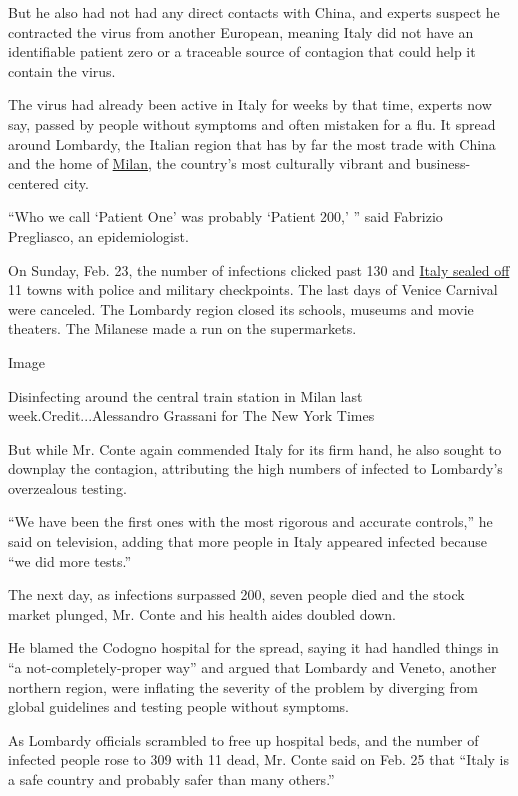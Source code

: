 But he also had not had any direct contacts with China, and experts
suspect he contracted the virus from another European, meaning Italy did
not have an identifiable patient zero or a traceable source of contagion
that could help it contain the virus.

The virus had already been active in Italy for weeks by that time,
experts now say, passed by people without symptoms and often mistaken
for a flu. It spread around Lombardy, the Italian region that has by far
the most trade with China and the home of
\href{https://www.nytimes3xbfgragh.onion/2020/02/24/world/europe/24coronavirus-milan-italy.html?searchResultPosition=40}{Milan},
the country's most culturally vibrant and business-centered city.

``Who we call `Patient One' was probably `Patient 200,' '' said Fabrizio
Pregliasco, an epidemiologist.

On Sunday, Feb. 23, the number of infections clicked past 130 and
\href{https://www.nytimes3xbfgragh.onion/2020/02/23/world/europe/italy-coronavirus.html?searchResultPosition=3}{Italy
sealed off} 11 towns with police and military checkpoints. The last days
of Venice Carnival were canceled. The Lombardy region closed its
schools, museums and movie theaters. The Milanese made a run on the
supermarkets.

Image

Disinfecting around the central train station in Milan last
week.Credit...Alessandro Grassani for The New York Times

But while Mr. Conte again commended Italy for its firm hand, he also
sought to downplay the contagion, attributing the high numbers of
infected to Lombardy's overzealous testing.

``We have been the first ones with the most rigorous and accurate
controls,'' he said on television, adding that more people in Italy
appeared infected because ``we did more tests.''

The next day, as infections surpassed 200, seven people died and the
stock market plunged, Mr. Conte and his health aides doubled down.

He blamed the Codogno hospital for the spread, saying it had handled
things in ``a not-completely-proper way'' and argued that Lombardy and
Veneto, another northern region, were inflating the severity of the
problem by diverging from global guidelines and testing people without
symptoms.

As Lombardy officials scrambled to free up hospital beds, and the number
of infected people rose to 309 with 11 dead, Mr. Conte said on Feb. 25
that ``Italy is a safe country and probably safer than many others.''

